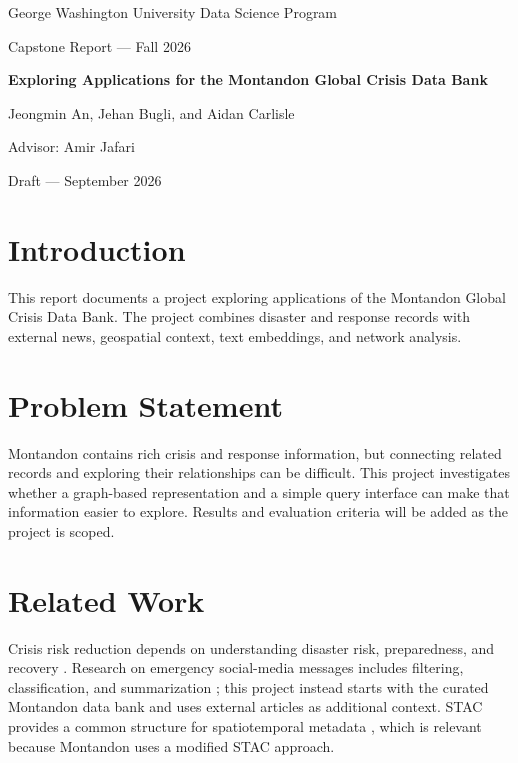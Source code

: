 \documentclass[11pt]{article}
\begin{document}
\begin{titlepage}
\centering
{\Large George Washington University Data Science Program\par}
\vspace{1cm}
{\large Capstone Report --- Fall 2026\par}
\vspace{1.5cm}
{\huge\bfseries Exploring Applications for the Montandon Global Crisis Data Bank\par}
\vspace{2cm}
{\large Jeongmin An, Jehan Bugli, and Aidan Carlisle\par}
\vspace{1cm}
{\large Advisor: Amir Jafari\par}
\vfill
{\large Draft --- September 2026\par}
\end{titlepage}

\tableofcontents
\newpage

\section{Introduction}

This report documents a project exploring applications of the Montandon Global Crisis
Data Bank. The project combines disaster and response records with external news,
geospatial context, text embeddings, and network analysis.

\section{Problem Statement}

Montandon contains rich crisis and response information, but connecting related records
and exploring their relationships can be difficult. This project investigates whether a
graph-based representation and a simple query interface can make that information easier
to explore. Results and evaluation criteria will be added as the project is scoped.

\section{Related Work}

Crisis risk reduction depends on understanding disaster risk, preparedness, and recovery
\cite{undrr2015sendai}. Research on emergency social-media messages
includes filtering, classification, and summarization \cite{imran2015processing}; this
project instead starts with the curated Montandon data bank and uses external articles as
additional context. STAC provides a common structure for spatiotemporal metadata
\cite{ogc2025stac}, which is relevant because Montandon uses a modified STAC approach.
\end{document}
